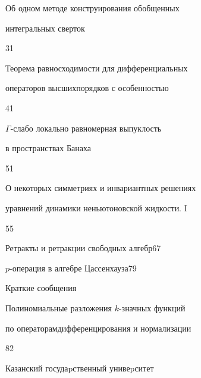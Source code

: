 

{Об одном методе конструирования обобщенных\newline


интегральных сверток}{31}




{Теорема равносходимости для дифференциальных  


операторов высших\newline порядков с особенностью}{41}




{$\Gamma$-слабо локально равномерная выпуклость  


в пространствах Банаха}{51}




{О некоторых симметриях и инвариантных решениях\newline


уравнений динамики неньютоновской жидкости. I}{55}




{Ретракты и ретракции свободных алгебр}{67}




{$p$-операция в алгебре Цассенхауза}{79}





\bigskip


{\centerline {Краткие сообщения}}


\bigskip







{Полиномиальные разложения $k$-значных функций  


по операторам\newline дифференцирования и нормализации}{82}














\vfill


\noindent\raisebox{2pt}{\copyright} Казанский госудаpственный унивеpситет





